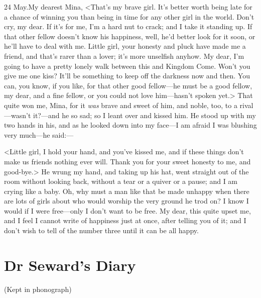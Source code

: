 \begin{mail}{24 May.}{My dearest Mina,}
<That's my brave girl. It's better worth being late for a chance of winning you than being in time for any other girl in the world. Don't cry, my dear. If it's for me, I'm a hard nut to crack; and I take it standing up. If that other fellow doesn't know his happiness, well, he'd better look for it soon, or he'll have to deal with me. Little girl, your honesty and pluck have made me a friend, and that's rarer than a lover; it's more unselfish anyhow. My dear, I'm going to have a pretty lonely walk between this and Kingdom Come. Won't you give me one kiss? It'll be something to keep off the darkness now and then. You can, you know, if you like, for that other good fellow—he must be a good fellow, my dear, and a fine fellow, or you could not love him—hasn't spoken yet.> That quite won me, Mina, for it \textit{was} brave and sweet of him, and noble, too, to a rival—wasn't it?—and he so sad; so I leant over and kissed him. He stood up with my two hands in his, and as he looked down into my face—I am afraid I was blushing very much—he said:—

<Little girl, I hold your hand, and you've kissed me, and if these things don't make us friends nothing ever will. Thank you for your sweet honesty to me, and good-bye.> He wrung my hand, and taking up his hat, went straight out of the room without looking back, without a tear or a quiver or a pause; and I am crying like a baby. Oh, why must a man like that be made unhappy when there are lots of girls about who would worship the very ground he trod on? I know I would if I were free—only I don't want to be free. My dear, this quite upset me, and I feel I cannot write of happiness just at once, after telling you of it; and I don't wish to tell of the number three until it can be all happy.


\end{mail}


\section{Dr Seward's Diary} 
\begin{center}(Kept in phonograph)\end{center}

